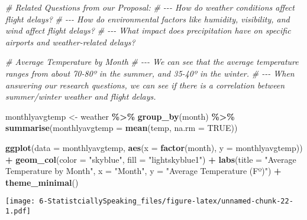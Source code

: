 \documentclass[
]{article}
\newenvironment{Shaded}{\begin{snugshade}}{\end{snugshade}}
\newcommand{\AttributeTok}[1]{\textcolor[rgb]{0.13,0.29,0.53}{#1}}
\newcommand{\CommentTok}[1]{\textcolor[rgb]{0.56,0.35,0.01}{\textit{#1}}}
\newcommand{\ConstantTok}[1]{\textcolor[rgb]{0.56,0.35,0.01}{#1}}
\newcommand{\FunctionTok}[1]{\textcolor[rgb]{0.13,0.29,0.53}{\textbf{#1}}}
\newcommand{\NormalTok}[1]{#1}
\newcommand{\OtherTok}[1]{\textcolor[rgb]{0.56,0.35,0.01}{#1}}
\newcommand{\SpecialCharTok}[1]{\textcolor[rgb]{0.81,0.36,0.00}{\textbf{#1}}}
\newcommand{\StringTok}[1]{\textcolor[rgb]{0.31,0.60,0.02}{#1}}
\begin{document}
\begin{Shaded}
\begin{Highlighting}[]
\CommentTok{\# Related Questions from our Proposal:}
\CommentTok{\# {-}{-}{-} How do weather conditions affect flight delays? }
\CommentTok{\# {-}{-}{-} How do environmental factors like humidity, visibility, and wind affect flight delays? }
\CommentTok{\# {-}{-}{-} What impact does precipitation have on specific airports and weather{-}related delays? }


\CommentTok{\# Average Temperature by Month}
\CommentTok{\# {-}{-}{-} We can see that the average temperature ranges from about 70{-}80º in the summer, and 35{-}40º in the winter. }
\CommentTok{\# {-}{-}{-} When answering our research questions, we can see if there is a correlation between summer/winter weather and flight delays.}

\NormalTok{monthlyavgtemp }\OtherTok{\textless{}{-}}\NormalTok{ weather }\SpecialCharTok{\%\textgreater{}\%}
  \FunctionTok{group\_by}\NormalTok{(month) }\SpecialCharTok{\%\textgreater{}\%}
  \FunctionTok{summarise}\NormalTok{(}\AttributeTok{monthlyavgtemp =} \FunctionTok{mean}\NormalTok{(temp, }\AttributeTok{na.rm =} \ConstantTok{TRUE}\NormalTok{))}

\FunctionTok{ggplot}\NormalTok{(}\AttributeTok{data =}\NormalTok{ monthlyavgtemp,}
       \FunctionTok{aes}\NormalTok{(}\AttributeTok{x =} \FunctionTok{factor}\NormalTok{(month), }\AttributeTok{y =}\NormalTok{ monthlyavgtemp)) }\SpecialCharTok{+}
  \FunctionTok{geom\_col}\NormalTok{(}\AttributeTok{color =} \StringTok{"skyblue"}\NormalTok{, }\AttributeTok{fill =} \StringTok{"lightskyblue1"}\NormalTok{) }\SpecialCharTok{+} 
  \FunctionTok{labs}\NormalTok{(}\AttributeTok{title =} \StringTok{"Average Temperature by Month"}\NormalTok{,}
       \AttributeTok{x =} \StringTok{"Month"}\NormalTok{,}
       \AttributeTok{y =} \StringTok{"Average Temperature (Fº)"}\NormalTok{) }\SpecialCharTok{+}
  \FunctionTok{theme\_minimal}\NormalTok{()}
\end{Highlighting}
\end{Shaded}

\texttt{[image: 6-StatistciallySpeaking\_files/figure-latex/unnamed-chunk-22-1.pdf]}
\end{document}
